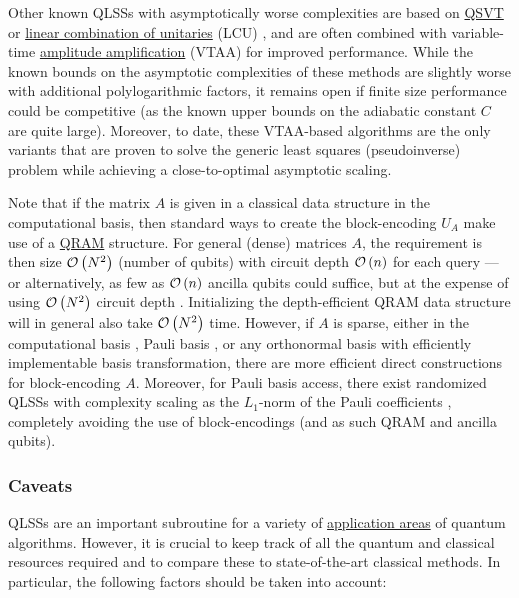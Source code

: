 \begin{refsection}
Other known QLSSs with asymptotically worse complexities are based on \hyperref[prim:QSVT]{QSVT} \cite{gilyen2018QSingValTransf,martyn2021GrandUnificationQAlgs} or \hyperref[prim:TaylorDyson]{linear combination of unitaries} (LCU) \cite{childs2015QLinSysExpPrec}, and are often combined with variable-time \hyperref[prim:AmpAmp]{amplitude amplification} (VTAA) \cite{ambainis2010VTAA,ambainis2023ImprovedVTQS} for improved performance. While the known bounds on the asymptotic complexities of these methods are slightly worse with additional polylogarithmic factors, it remains open if finite size performance could be competitive (as the known upper bounds on the adiabatic constant $C$ are quite large). Moreover, to date, these VTAA-based algorithms are the only variants that are proven to solve the generic least squares (pseudoinverse) problem while achieving a close-to-optimal asymptotic scaling.

Note that if the matrix $A$ is given in a classical data structure in the computational basis, then standard ways to create the block-encoding $U_A$ make use of a \hyperref[prim:QRAM]{QRAM} structure. For general (dense) matrices $A$, the requirement is then size $\mathcal{O}\left( N^2 \right)$ (number of qubits) with circuit depth $\mathcal{O}\left( n \right)$ for each query --- or alternatively, as few as $\mathcal{O}\left( n \right)$ ancilla qubits could suffice, but at the expense of using $\mathcal{O}\left( N^2 \right)$ circuit depth \cite{hann2021resilienceofQRAM,clader2022resourcesForBlockEncoding}.
Initializing the depth-efficient QRAM data structure will in general also take $\mathcal{O}\left( N^2 \right)$ time. However, if $A$ is sparse, either in the computational basis \cite{dimatteo2020FaultTolerantQRAM}, Pauli basis \cite{Wan2021exponentiallyfaster}, or any orthonormal basis with efficiently implementable basis transformation, there are more efficient direct constructions for block-encoding $A$. Moreover, for Pauli basis access, there exist randomized QLSSs with complexity scaling as the $L_1$-norm of the Pauli coefficients \cite{samson2023qubitefflinalg}, completely avoiding the use of block-encodings (and as such QRAM and ancilla qubits).


\subsubsection*{Caveats}

QLSSs are an important subroutine for a variety of \hyperref[applications]{application areas} of quantum algorithms. However, it is crucial to keep track of all the quantum and classical resources required and to compare these to state-of-the-art classical methods. In particular, the following factors should be taken into account:


\end{refsection}

